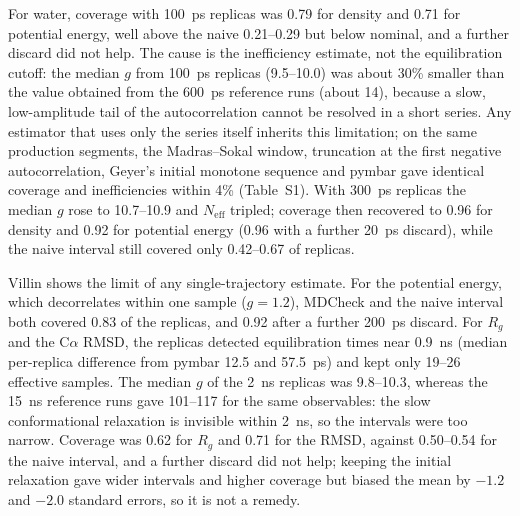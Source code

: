 \documentclass[9pt,lessons]{livecoms}
\newcommand{\tabdir}{tables}
\begin{document}
For water, coverage with 100~ps replicas was 0.79 for density and 0.71 for potential energy, well above the naive 0.21--0.29 but below nominal, and a further discard did not help. The cause is the inefficiency estimate, not the equilibration cutoff: the median $g$ from 100~ps replicas (9.5--10.0) was about 30\% smaller than the value obtained from the 600~ps reference runs (about 14), because a slow, low-amplitude tail of the autocorrelation cannot be resolved in a short series. Any estimator that uses only the series itself inherits this limitation; on the same production segments, the Madras--Sokal window, truncation at the first negative autocorrelation, Geyer's initial monotone sequence \cite{geyer1992} and pymbar gave identical coverage and inefficiencies within 4\% (Table~S1). With 300~ps replicas the median $g$ rose to 10.7--10.9 and $N_{\mathrm{eff}}$ tripled; coverage then recovered to 0.96 for density and 0.92 for potential energy (0.96 with a further 20~ps discard), while the naive interval still covered only 0.42--0.67 of replicas.

Villin shows the limit of any single-trajectory estimate. For the potential energy, which decorrelates within one sample ($g = 1.2$), MDCheck and the naive interval both covered 0.83 of the replicas, and 0.92 after a further 200~ps discard. For $R_g$ and the C$\alpha$ RMSD, the replicas detected equilibration times near 0.9~ns (median per-replica difference from pymbar 12.5 and 57.5~ps) and kept only 19--26 effective samples. The median $g$ of the 2~ns replicas was 9.8--10.3, whereas the 15~ns reference runs gave 101--117 for the same observables: the slow conformational relaxation is invisible within 2~ns, so the intervals were too narrow. Coverage was 0.62 for $R_g$ and 0.71 for the RMSD, against 0.50--0.54 for the naive interval, and a further discard did not help; keeping the initial relaxation gave wider intervals and higher coverage but biased the mean by $-1.2$ and $-2.0$ standard errors, so it is not a remedy.

\begin{table}[t]
\centering\scriptsize
\caption{OpenMM benchmark. For each data set: median equilibration time, statistical inefficiency and $N_{\mathrm{eff}}$; coverage of the reference mean by the naive interval, by MDCheck, and by MDCheck with a further discard (20~ps; 200~ps for villin); bias of the mean without any equilibration discard, in production standard errors; and alarm rates of the replica tests on non-overlapping triples of replicas of the same ensemble (nominal 0.05 for the $Q$ test).}
\label{tab:md}
\resizebox{\textwidth}{!}{}
\end{table}
\end{document}

